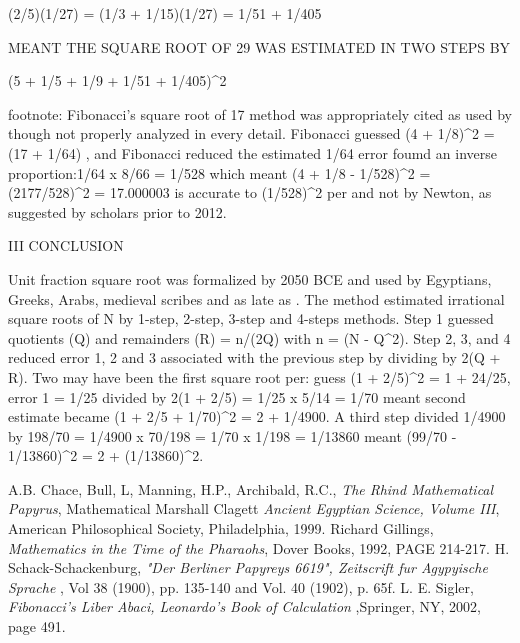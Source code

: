 \documentclass[12pt]{article}
\begin{document}
(2/5)(1/27) = (1/3 + 1/15)(1/27) = 1/51 + 1/405

MEANT THE SQUARE ROOT OF 29 WAS ESTIMATED IN TWO STEPS BY

(5 + 1/5 + 1/9 + 1/51 + 1/405)^2

footnote: Fibonacci's square root of 17 method was appropriately cited as used by  though not properly analyzed in every detail. Fibonacci guessed (4 + 1/8)^2 = (17 + 1/64) , and Fibonacci  reduced the  estimated 1/64 error foumd an inverse proportion:1/64 x  8/66 = 1/528 which meant (4 + 1/8 - 1/528)^2 = (2177/528)^2 = 17.000003 is accurate to (1/528)^2  per and not by Newton, as suggested by scholars prior to 2012.

III CONCLUSION

Unit fraction square root was formalized by 2050 BCE and used  by Egyptians, Greeks, Arabs, medieval scribes and  as late as . The method estimated irrational square roots of N by 1-step, 2-step, 3-step and 4-steps methods. Step 1 guessed quotients (Q)  and remainders (R) = n/(2Q) with  n = (N - Q^2). Step 2, 3, and 4 reduced error 1, 2 and 3 associated with the previous step by dividing by 2(Q + R). Two may have been the first square root per: guess (1 + 2/5)^2 = 1 + 24/25, error 1 = 1/25 divided by 2(1 + 2/5) = 1/25 x 5/14 = 1/70 meant second estimate became (1 + 2/5 + 1/70)^2 = 2 + 1/4900. A third step divided 1/4900 by 198/70 = 1/4900 x 70/198 = 1/70 x 1/198 = 1/13860 meant 
(99/70 - 1/13860)^2 = 2 + (1/13860)^2.

\begin{thebibliography}{5}
A.B. Chace, Bull, L, Manning, H.P., Archibald, R.C., \emph{The Rhind Mathematical Papyrus}, Mathematical 
Marshall Clagett \emph{Ancient Egyptian Science, Volume III}, American Philosophical Society, Philadelphia, 1999.
Richard Gillings, \emph{Mathematics in the Time of the Pharaohs}, Dover Books, 1992, PAGE 214-217.
 H. Schack-Schackenburg, \emph{"Der Berliner Papyreys 6619", Zeitscrift fur Agypyische Sprache} , Vol 38 (1900), pp. 135-140 and Vol. 40 (1902), p. 65f.
 L. E. Sigler, \emph{Fibonacci's Liber Abaci, Leonardo's Book of Calculation} ,Springer, NY, 2002, page 491. 

\end{thebibliography}

\end{document}
